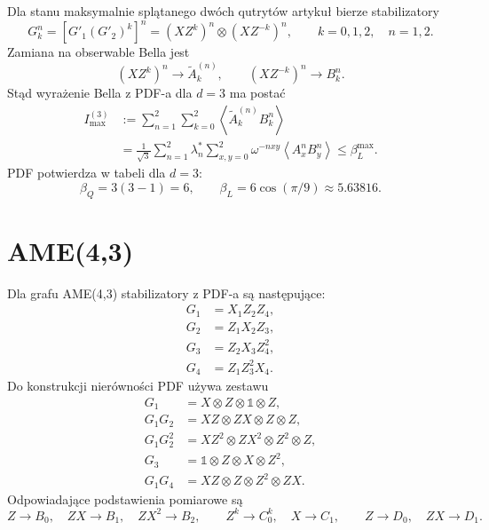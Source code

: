 \documentclass[12pt]{article}
\newcommand{\id}{\mathbb{1}}
\begin{document}
Dla stanu maksymalnie spl\k{a}tanego dw\'och qutryt\'ow artyku\l{} bierze stabilizatory
\begin{equation}
    G_k^n=
    \left[G'_1(G'_2)^k\right]^n
    =
    (XZ^k)^n\otimes(XZ^{-k})^n,
    \qquad k=0,1,2,\quad n=1,2.
\end{equation}
Zamiana na obserwable Bella jest
\begin{equation}
    (XZ^k)^n\longrightarrow \widetilde{A}^{(n)}_k,
    \qquad
    (XZ^{-k})^n\longrightarrow B_k^n.
\end{equation}
St\k{a}d wyra\.zenie Bella z PDF-a dla $d=3$ ma posta\'c
\begin{align}
    I_{\max}^{(3)}
    &:=
    \sum_{n=1}^{2}\sum_{k=0}^{2}
    \left\langle \widetilde{A}^{(n)}_k B_k^n \right\rangle \\
    &=
    \frac{1}{\sqrt{3}}
    \sum_{n=1}^{2}\lambda_n^*
    \sum_{x,y=0}^{2}
    \omega^{-nxy}
    \left\langle A_x^n B_y^n \right\rangle
    \leq \beta_L^{\max}.
\end{align}
PDF potwierdza w tabeli dla $d=3$:
\begin{equation}
    \beta_Q=3(3-1)=6,
    \qquad
    \beta_L=6\cos(\pi/9)\approx 5.63816.
\end{equation}

\section{AME(4,3)}

Dla grafu AME(4,3) stabilizatory z PDF-a s\k{a} nast\k{e}puj\k{a}ce:
\begin{align}
    G_1 &= X_1 Z_2 Z_4,\\
    G_2 &= Z_1 X_2 Z_3,\\
    G_3 &= Z_2 X_3 Z_4^2,\\
    G_4 &= Z_1 Z_3^2 X_4.
\end{align}
Do konstrukcji nier\'owno\'sci PDF u\.zywa zestawu
\begin{align}
    G_1 &= X\otimes Z\otimes \id\otimes Z,\\
    G_1G_2 &= XZ\otimes ZX\otimes Z\otimes Z,\\
    G_1G_2^2 &= XZ^2\otimes ZX^2\otimes Z^2\otimes Z,\\
    G_3 &= \id\otimes Z\otimes X\otimes Z^2,\\
    G_1G_4 &= XZ\otimes Z\otimes Z^2\otimes ZX.
\end{align}
Odpowiadaj\k{a}ce podstawienia pomiarowe s\k{a}
\begin{equation}
    Z\to B_0,\quad ZX\to B_1,\quad ZX^2\to B_2,
    \qquad
    Z^k\to C_0^k,\quad X\to C_1,
    \qquad
    Z\to D_0,\quad ZX\to D_1.
\end{equation}
\end{document}
